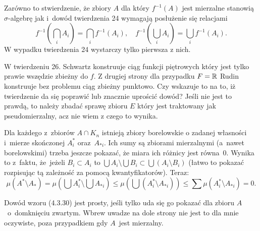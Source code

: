 \documentclass[a4paper,11pt]{article}
\begin{document}
\vspace{\spaceFour}


\start {} Zarówno to stwierdzenie, że zbiory $A$ dla który
$f^{ -1 }( A )$ jest mierzalne stanowią $\sigma$-algebrę jak i~dowód twierdzenia 24 wymagają posłużenie się relacjami
\begin{equation}
  \label{eq:SchwartzKAMVolI-05}
  f^{ -1 }( \bigcap_{ i } A_{ i } ) = \bigcap_{ i } f^{ -1 }( A_{ i } ), \quad
  f^{ -1 }( \bigcup_{ i } A_{ i } ) = \bigcup_{ i } f^{ -1 }( A_{ i } ).
\end{equation}
W wypadku twierdzenia 24 wystarczy tylko pierwsza z nich.

\vspace{\spaceFour}


\start {} W twierdzeniu 26. Schwartz konstruuje ciąg funkcji
piętrowych który jest tylko prawie wszędzie zbieżny do $f$. Z drugiej
strony dla przypadku $F = \mathbb{R}$ Rudin \cite{RudinAnalizaRzeczywistaIZespolona1998} konstruuje bez
problemu ciąg zbieżny punktowo. Czy wskazuje to na to, iż twierdzenie
da się poprawić lub znacznie uprościć dowód? Jeśli nie jest to prawdą,
to należy zbadać sprawę zbioru $E$ który jest traktowany jak
pseudomierzalny, acz nie wiem z czego to wynika.

\vspace{\spaceFour}


\start {} Dla każdego z~zbiorów $A \cap K_{ n }$ istnieją
zbiory borelowskie o zadanej własności i~mierze skończonej
$A_{ i }^{ * }$ oraz~$A_{ * i }$. Ich sumy są zbiorami mierzalnymi
(a~nawet borelowskimi) trzeba jeszcze pokazać, że miara ich różnicy
jest równa~0. Wynika to z~faktu, że~jeżeli $B_{ i } \subset A_{ i }$
to $\bigcup A_{ i } \setminus \bigcup B_{ i } \subset \bigcup ( A_{ i } \setminus B_{ i } )$ (łatwo to pokazać rozpisując tą zależność za pomocą kwantyfikatorów). Teraz:
\begin{equation}
  \label{eq:SchwartzKAMVolI-06}
  \mu( A^{ * } \setminus A_{ * } ) = \mu\left( \bigcup A^{ * }_{ i }
    \setminus \bigcup A_{ * i } \right) \leq \mu\left( \bigcup
    ( A^{ * }_{ i } \setminus A_{ * i } ) \right) \leq
  \sum \mu( A^{ * }_{ i } \setminus A_{ * i } ) = 0.
\end{equation}

\vspace{\spaceFour}


\start {} Dowód wzoru (4.3.30) jest prosty, jeśli tylko uda się
go pokazać dla zbioru $A$~o~domknięciu zwartym. Wbrew uwadze na dole
strony nie jest to dla mnie oczywiste, poza przypadkiem gdy $A$~jest
mierzalny.
\end{document}
